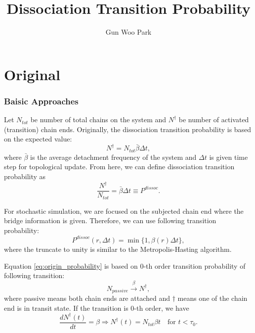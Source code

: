 \documentclass[slidestop, compress, mathserif]{beamer}
\title{Dissociation Transition Probability}
\author{Gun Woo Park}
\begin{document}
\begin{frame}[plain]
  \maketitle
\end{frame}

\section{Original}
\begin{frame}
  \frametitle{Baisic Approaches}
  Let $N_{tot}$ be number of total chains on the system and $N^\dagger$ be number of activated (transition) chain ends. Originally, the dissociation transition probability is based on the expected value:
  \begin{equation}
    N^\dagger = N_{tot} \bar{\beta}\Delta t\label{eq:origin_probability},
  \end{equation}
  where $\bar{\beta}$ is the average detachment frequency of the system and $\Delta t$ is given time step for topological update.
  From here, we can define dissociation transition probability as
  \begin{equation}
    \frac{N^\dagger}{N_{tot}} = \bar{\beta}\Delta t \equiv P^{dissoc}.
  \end{equation}

\end{frame}

\begin{frame}
  For stochastic simulation, we are focused on the subjected chain end where the bridge information is given. Therefore, we can use following transition probability:
  \begin{equation}
    P^{dissoc}(r, \Delta t) = \min\{1, \beta(r)\Delta t\},
  \end{equation}
  where the truncate to unity is similar to the Metropolis-Hasting algorithm.

  Equation \eqref{eq:origin_probability} is based on 0-th order transition probability of following transition:
  \begin{equation}
    N_{passive} \xrightarrow{\beta} N^\dagger,
  \end{equation}
  where passive means both chain ends are attached and $\dagger$ means one of the chain end is in transit state. 
  If the transition is 0-th order, we have
  \begin{equation}
    \frac{d N^\dagger(t)}{dt} = \beta \Rightarrow N^\dagger(t) = N_{tot}\beta t\quad\textrm{for }t<\tau_0. \label{eq:0th_order}
  \end{equation}
\end{frame}
\end{document}
